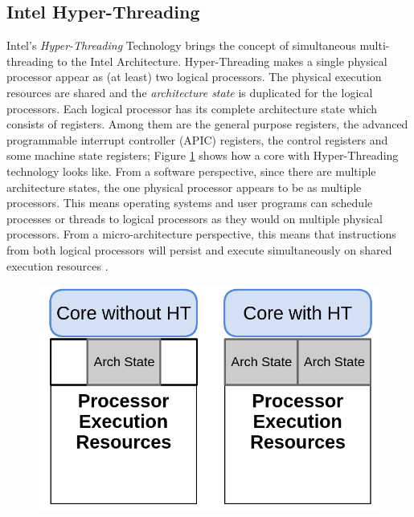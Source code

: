 \subsection{Intel Hyper-Threading}
\label{subsec:hyper-treading}
Intel's \textit{Hyper-Threading} Technology brings the concept of simultaneous multi-threading to the Intel Architecture. Hyper-Threading makes a single physical processor appear as (at least) two logical processors. The physical execution resources are shared and the \textit{architecture state} is duplicated for the logical processors. Each logical processor has its complete architecture state which consists of registers. Among them are the general purpose registers, the advanced programmable interrupt controller (APIC) registers, the control registers and some machine state registers; Figure \ref{fig:Hyper-Threading} shows how a core with Hyper-Threading technology looks like. From a software perspective, since there are multiple architecture states, the one physical processor appears to be as multiple processors. This means operating systems and user programs can schedule processes or threads to logical processors as they would on multiple physical processors. From a micro-architecture perspective, this means that instructions from both logical processors will persist and execute simultaneously on shared execution resources \cite{Hyper-Threading}.

\begin{figure}[h]
	\centering
	\includegraphics[height=0.35\textheight]{images/Hyper-Threading.png}
	\label{fig:Hyper-Threading}
\end{figure}

